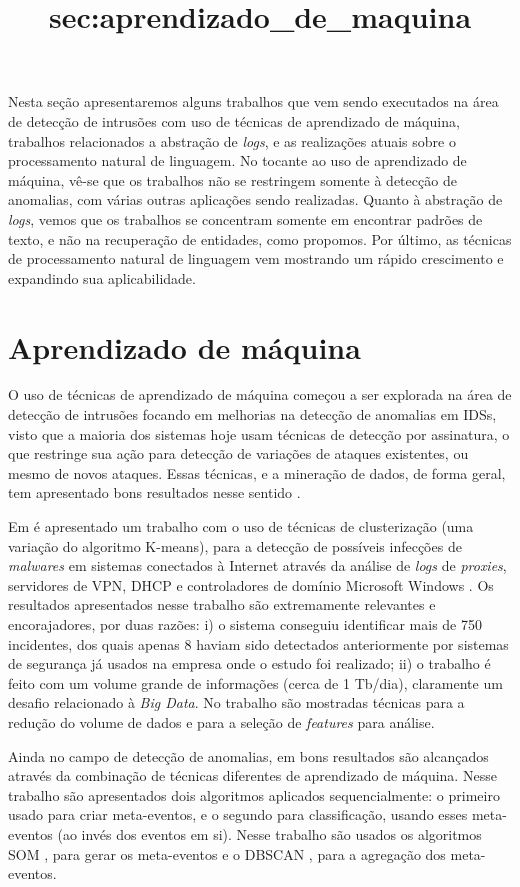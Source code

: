 \documentclass[
	12pt,				%
	openright,			%
	twoside,			%
	a4paper,			%
	english,			%
	french,				%
	spanish,			%
	brazil,				%
	]{abntex2}
\begin{document}
Nesta seção apresentaremos alguns trabalhos que vem sendo executados na área de detecção de intrusões com uso de técnicas de aprendizado de máquina, trabalhos relacionados a abstração de \emph{logs}, e as realizações atuais sobre o processamento natural de linguagem. No tocante ao uso de aprendizado de máquina, vê-se que os trabalhos não se restringem somente à detecção de anomalias, com várias outras aplicações sendo realizadas. Quanto à abstração de \emph{logs}, vemos que os trabalhos se concentram somente em encontrar padrões de texto, e não na recuperação de entidades, como propomos. Por último, as técnicas de processamento natural de linguagem vem mostrando um rápido crescimento e expandindo sua aplicabilidade.

\section{Aprendizado de máquina}\title{sec:aprendizado_de_maquina}
O uso de técnicas de aprendizado de máquina começou a ser explorada na área de detecção de intrusões focando em melhorias na detecção de anomalias em IDSs, visto que a maioria dos sistemas hoje usam técnicas de detecção por assinatura, o que restringe sua ação para detecção de variações de ataques existentes, ou mesmo de novos ataques. Essas técnicas, e a mineração de dados, de forma geral, tem apresentado bons resultados nesse sentido \cite{dua2011data, yen2013beehive, zomlot2013aiding, ganapathy2012intelligent, li2013automatic, joseph2012machine}.

Em \cite{yen2013beehive} é apresentado um trabalho com o uso de técnicas de clusterização (uma variação do algoritmo K-means\cite{ball1967clustering}), para a detecção de possíveis infecções de \emph{malwares} em sistemas conectados à Internet através da análise de \emph{logs} de \emph{proxies}, servidores de VPN, DHCP e controladores de domínio Microsoft Windows \texttrademark. Os resultados apresentados nesse trabalho são extremamente relevantes e encorajadores, por duas razões: i) o sistema conseguiu identificar mais de 750 incidentes, dos quais apenas 8 haviam sido detectados anteriormente por sistemas de segurança já usados na empresa onde o estudo foi realizado; ii) o trabalho é feito com um volume grande de informações (cerca de 1 Tb/dia), claramente um desafio relacionado à \emph{Big Data}. No trabalho são mostradas técnicas para a redução do volume de dados e para a seleção de \emph{features} para análise.

Ainda no campo de detecção de anomalias, em \cite{li2013automatic} bons resultados são alcançados através da combinação de técnicas diferentes de aprendizado de máquina. Nesse trabalho são apresentados dois algoritmos aplicados sequencialmente: o primeiro usado para criar meta-eventos, e o segundo para classificação, usando esses meta-eventos (ao invés dos eventos em si). Nesse trabalho são usados os algoritmos SOM \cite{kohonen1989self}, para gerar os meta-eventos e o DBSCAN \cite{ester1996density}, para a agregação dos meta-eventos.
\end{document}

